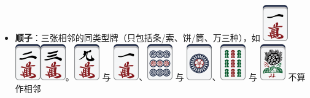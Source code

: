 \documentclass[
	lang=cn,
	color=green
]{elegantbook}
\begin{document}
\begin{remark}
\begin{itemize}
        \item \textbf{顺子}：三张相邻的同类型牌（只包括条/索、饼/筒、万三种），如 \includegraphics[scale=0.5]{images/mahjong/1m.png}\includegraphics[scale=0.5]{images/mahjong/2m.png}\includegraphics[scale=0.5]{images/mahjong/3m.png}。\includegraphics[scale=0.5]{images/mahjong/9m.png} 与 \includegraphics[scale=0.5]{images/mahjong/1m.png}、\includegraphics[scale=0.5]{images/mahjong/9p.png} 与 \includegraphics[scale=0.5]{images/mahjong/1p.png}、\includegraphics[scale=0.5]{images/mahjong/9s.png} 与 \includegraphics[scale=0.5]{images/mahjong/1s.png} 不算作相邻
    \end{itemize}

\end{remark}
\end{document}
